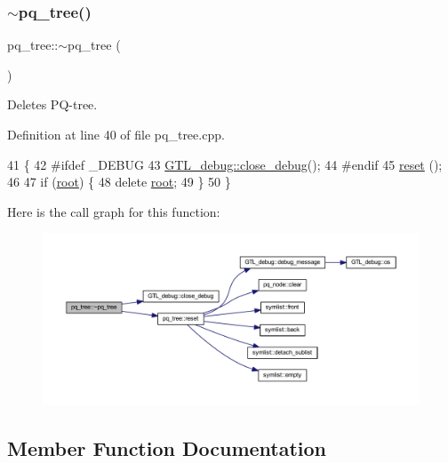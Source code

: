 \subsubsection{\texorpdfstring{$\sim$pq\+\_\+tree()}{~pq\_tree()}}
{\footnotesize\ttfamily pq\+\_\+tree\+::$\sim$pq\+\_\+tree (\begin{DoxyParamCaption}{ }\end{DoxyParamCaption})}



Deletes P\+Q-\/tree. 



Definition at line 40 of file pq\+\_\+tree.\+cpp.


\begin{DoxyCode}
41 \{
42 \textcolor{preprocessor}{#ifdef \_DEBUG  }
43     \mbox{\hyperlink{class_g_t_l__debug_a18b39d8b303a59062f86702a01ab6a98}{GTL\_debug::close\_debug}}();
44 \textcolor{preprocessor}{#endif}
45     \mbox{\hyperlink{classpq__tree_a1e2bdfb9af85972e9254260d74c63651}{reset}} ();
46 
47     \textcolor{keywordflow}{if} (\mbox{\hyperlink{classpq__tree_ad8e4e2235fe68fb99769cec54e1760ba}{root}}) \{
48     \textcolor{keyword}{delete} \mbox{\hyperlink{classpq__tree_ad8e4e2235fe68fb99769cec54e1760ba}{root}};
49     \}
50 \}
\end{DoxyCode}
Here is the call graph for this function\+:\nopagebreak
\begin{figure}[H]
\begin{center}
\leavevmode
\includegraphics[width=350pt]{classpq__tree_ae6b44b3a6db8914beb368aee2bf7cc92_cgraph}
\end{center}
\end{figure}


\subsection{Member Function Documentation}
\mbox{\label{classpq__tree_a6ce932de3106ad6c9d84bb2058784b0a}} 
